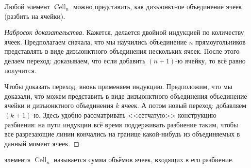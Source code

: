 \documentclass{notes}
\DeclareMathOperator{\Cell}{Cell}
\begin{document}
	\begin{st}
		Любой элемент $\Cell_n$ можно представить, как дизъюнктное объединение ячеек (разбить на ячейки).
		\begin{proof}[Набросок доказательства]
			Кажется, делается двойной индукцией по количеству ячеек. Предполагаем сначала, что мы научились объединение $n$ прямоугольников представлять в виде дизъюнктного объединения нескольких ячеек. После этого делаем переход: доказываем, что если добавить $(n+1)$-ю ячейку, то всё равно получится.

			Чтобы доказать переход, вновь применяем индукцию. Предположим, что мы доказали, что можем представить в виде дизъюнктного объединения объединение ячейки и дизъюнктного объединения $k$ ячеек. А потом новый переход: добавляем $(k + 1)$-ю. Здесь удобно рассматривать <<сетчатую>> конструкцию разбиения: на пути индукции всё время поддерживать разбиение таким, чтобы все разрезающие линии кончались на границе какой-нибудь из объединяемых в данный момент ячеек.
		\end{proof}
	\end{st}

	\begin{de}
		 элемента $\Cell_n$ называется сумма объёмов ячеек, входящих в его разбиение.
	\end{de}
\end{document}
